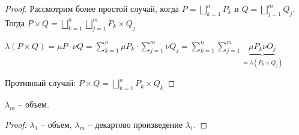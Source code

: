 \begin{proof}
    Рассмотрим более простой случай, когда $P = \bigsqcup\limits_{k=1}^n P_k$ и $Q = \bigsqcup\limits_{j=1}^m Q_j$. 
    Тогда $P\times Q = \bigsqcup\limits_{k=1}^n \bigsqcup\limits_{j=1}^m P_k \times Q_j$

    $\lambda(P \times Q) = \mu P \cdot \nu Q = \sum\limits_{k=1}^n \mu P_k \cdot \sum\limits_{j=1}^m \nu Q_j = \sum\limits_{k=1}^n \sum\limits_{j=1}^m \underbrace{\mu P_k \nu O_j}_{=\lambda (P_k \times Q_j)}$

    Противный случай: $P\times Q = \bigsqcup\limits_{k=1}^n P_k \times Q_k$
\end{proof}

\begin{corollary}
    $\lambda_m$ – объем.
\end{corollary}

\begin{proof}
    $\lambda_1$ – объем, $\lambda_m$ – декартово произведение $\lambda_1$.
\end{proof}